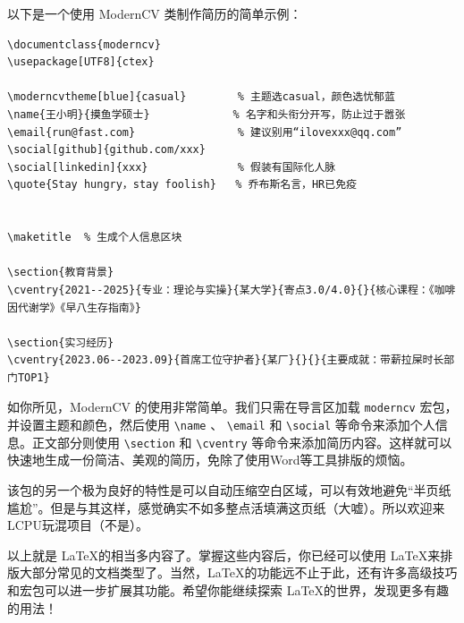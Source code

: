 以下是一个使用 ModernCV 类制作简历的简单示例：
\begin{verbatim}
\documentclass{moderncv}
\usepackage[UTF8]{ctex}

\moderncvtheme[blue]{casual}        % 主题选casual，颜色选忧郁蓝
\name{王小明}{摸鱼学硕士}             % 名字和头衔分开写，防止过于嚣张
\email{run@fast.com}                % 建议别用“ilovexxx@qq.com”
\social[github]{github.com/xxx}
\social[linkedin]{xxx}              % 假装有国际化人脉
\quote{Stay hungry，stay foolish}   % 乔布斯名言，HR已免疫


\maketitle  % 生成个人信息区块

\section{教育背景}
\cventry{2021--2025}{专业：理论与实操}{某大学}{寄点3.0/4.0}{}{核心课程：《咖啡因代谢学》《早八生存指南》}

\section{实习经历}
\cventry{2023.06--2023.09}{首席工位守护者}{某厂}{}{}{主要成就：带薪拉屎时长部门TOP1}

\end{verbatim}

如你所见，ModernCV 的使用非常简单。我们只需在导言区加载  \texttt{moderncv}  宏包，并设置主题和颜色，然后使用  \texttt{\textbackslash name} 、 \texttt{\textbackslash email}  和  \texttt{\textbackslash social}  等命令来添加个人信息。正文部分则使用  \texttt{\textbackslash section}  和  \texttt{\textbackslash cventry}  等命令来添加简历内容。这样就可以快速地生成一份简洁、美观的简历，免除了使用Word等工具排版的烦恼。

该包的另一个极为良好的特性是可以自动压缩空白区域，可以有效地避免“半页纸尴尬”。但是与其这样，感觉确实不如多整点活填满这页纸（大嘘）。所以欢迎来LCPU玩混项目（不是）。

以上就是 \LaTeX 的相当多内容了。掌握这些内容后，你已经可以使用 \LaTeX 来排版大部分常见的文档类型了。当然，\LaTeX 的功能远不止于此，还有许多高级技巧和宏包可以进一步扩展其功能。希望你能继续探索 \LaTeX 的世界，发现更多有趣的用法！